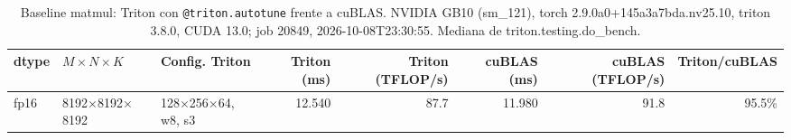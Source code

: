\begin{table}[htbp]
  \centering\small
  \begin{tabular}{lllrrrrr}
    \toprule
    dtype & $M \times N \times K$ & Config. Triton & Triton (ms) & Triton (TFLOP/s) & cuBLAS (ms) & cuBLAS (TFLOP/s) & Triton/cuBLAS \\
    \midrule
    fp16 & 8192$\times$8192$\times$8192 & 128$\times$256$\times$64, w8, s3 & 12.540 & 87.7 & 11.980 & 91.8 & 95.5\% \\
    \bottomrule
  \end{tabular}
  \caption{Baseline matmul: Triton con \texttt{@triton.autotune} frente a cuBLAS. NVIDIA GB10 (sm\_121), torch 2.9.0a0+145a3a7bda.nv25.10, triton 3.8.0, CUDA 13.0; job 20849, 2026-10-08T23:30:55. Mediana de triton.testing.do\_bench.}
  \label{tab:hennessy-energia-baseline-matmul}
\end{table}
